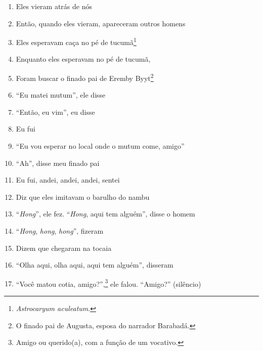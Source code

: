 \begin{enumerate}
 \item Eles vieram atrás de nós

 \begin{center}\end{center}

 \item Então, quando eles vieram, apareceram outros homens

 \item Eles esperavam caça no pé de tucumã\footnote{\textit{Astrocaryum
   aculeatum}.}

 \item Enquanto eles esperavam no pé de tucumã,

 \item Foram buscar o finado pai de Eremby Byyt\footnote{O finado pai de
   Augusta, esposa do narrador Barabadá.}

 \item ``Eu matei mutum'', ele disse

 \item ``Então, eu vim'', eu disse

 \item Eu fui

 \item ``Eu vou esperar no local onde o mutum come, amigo''

 \item ``Ah'', disse meu finado pai

 \begin{center}\end{center}

 \item Eu fui, andei, andei, andei, sentei

 \item Diz que eles imitavam o barulho do nambu

 \item ``\textit{Hong}'', ele fez. ``\textit{Hong}, aqui tem alguém'', disse o homem

 \item ``\textit{Hong}, \textit{hong}, \textit{hong}'', fizeram

 \item Dizem que chegaram na tocaia

 \item ``Olha aqui, olha aqui, aqui tem alguém'', disseram

 \item ``Você matou cotia, amigo?'',\footnote{Amigo ou querido(a), com a função
   de um vocativo.} ele falou. ``Amigo?'' (silêncio)


\end{enumerate}
